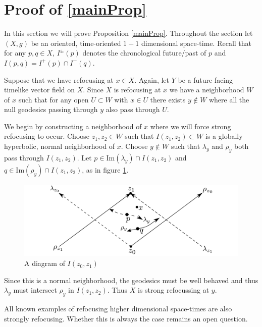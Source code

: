 \section{Proof of \ref{mainProp}}
In this section we will prove Proposition \ref{mainProp}.  Throughout the section let $(X, g)$ be an oriented, time-oriented $1+1$ dimensional space-time.  Recall that for any $p,q\in X$, $I^\pm(p)$ denotes the chronological future/past of $p$ and $I(p,q) = I^+(p) \cap I^-(q)$.

Suppose that we have refocusing at $x\in X$.  Again, let $Y$ be a future facing timelike vector field on $X$.  Since $X$ is refocusing at $x$ we have a neighborhood $W$ of $x$ such that for any open $U\subset W$ with $x\in U$ there exists $y\notin W$ where all the null geodesics passing through $y$ also pass through $U$.  

We begin by constructing a neighborhood of $x$ where we will force strong refocusing to occur.  Choose $z_1, z_2\in W$ such that $I(z_1, z_2) \subset W$ is a globally hyperbolic, normal neighborhood of $x$.  Choose $y \notin W$ such that $\lambda_y$ and $\rho_y$ both pass through $I(z_1, z_2)$.  Let $p\in \mbox{Im}(\lambda_y) \cap I(z_1, z_2)$ and $q\in \mbox{Im}(\rho_y) \cap I(z_1, z_2)$, as in figure \ref{figure2.fig}.

\begin{figure}[hbtp]
	\centering
	\includegraphics[width=12cm]{refocussingNbhd}
	\caption{A diagram of $I(z_0, z_1)$}
	\label{figure2.fig}
\end{figure}

Since this is a normal neighborhood, the geodesics must be well behaved and thus $\lambda_y$ must intersect $\rho_y$ in $I(z_1, z_2)$.  Thus $X$ is strong refocussing at $y$.

\begin{rem}
All known examples of refocusing higher dimensional space-times are also strongly refocusing.  Whether this is always the case remains an open question.
\end{rem}

